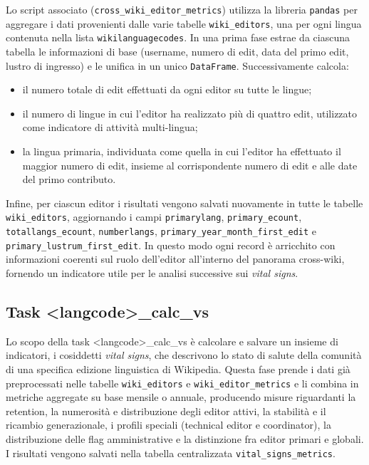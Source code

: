 Lo script associato (\texttt{cross\_wiki\_editor\_metrics}) utilizza la libreria \texttt{pandas} per aggregare i dati provenienti dalle varie tabelle \texttt{wiki\_editors}, una per ogni lingua contenuta nella lista \texttt{wikilanguagecodes}. In una prima fase estrae da ciascuna tabella le informazioni di base (username, numero di edit, data del primo edit, lustro di ingresso) e le unifica in un unico \texttt{DataFrame}. Successivamente calcola:
\begin{itemize}
    \item il numero totale di edit effettuati da ogni editor su tutte le lingue;
    \item il numero di lingue in cui l’editor ha realizzato più di quattro edit, utilizzato come indicatore di attività multi-lingua;
    \item la lingua primaria, individuata come quella in cui l’editor ha effettuato il maggior numero di edit, insieme al corrispondente numero di edit e alle date del primo contributo.
\end{itemize}

Infine, per ciascun editor i risultati vengono salvati nuovamente in tutte le tabelle \texttt{wiki\_editors}, aggiornando i campi \texttt{primarylang}, \texttt{primary\_ecount}, \texttt{totallangs\_ecount}, \texttt{numberlangs}, \texttt{primary\_year\_month\_first\_edit} e \texttt{primary\_lustrum\_first\_edit}. In questo modo ogni record è arricchito con informazioni coerenti sul ruolo dell’editor all’interno del panorama cross-wiki, fornendo un indicatore utile per le analisi successive sui \emph{vital signs}.

\subsection{Task \textless langcode\textgreater\_calc\_vs}
\label{subsec:calc_vs}

Lo scopo della task \textless langcode\textgreater\_calc\_vs è calcolare e salvare un insieme di indicatori, i cosiddetti \emph{vital signs}, che descrivono lo stato di salute della comunità di una specifica edizione linguistica di Wikipedia. 
Questa fase prende i dati già preprocessati nelle tabelle \texttt{wiki\_editors} e \texttt{wiki\_editor\_metrics} e li combina in metriche aggregate su base mensile o annuale, producendo misure riguardanti la retention, la numerosità e distribuzione degli editor attivi, la stabilità e il ricambio generazionale, i profili speciali (technical editor e coordinator), la distribuzione delle flag amministrative e la distinzione fra editor primari e globali. 
I risultati vengono salvati nella tabella centralizzata \texttt{vital\_signs\_metrics}.

